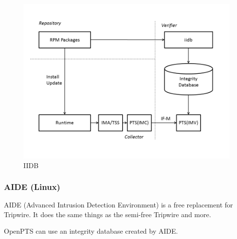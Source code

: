 \documentclass[12pt,a4paper]{article}
\begin{document}
\begin{figure}[b!p]
  \begin{center}
    \includegraphics[width=12cm]{OpenPTS_fig_iidb.png}
  \end{center}
  \caption{IIDB}
  \label{fig:iidb} 
\end{figure}


\clearpage 
\subsubsection{AIDE (Linux)}

AIDE (Advanced Intrusion Detection Environment)\cite{aide} is a free replacement for Tripwire. It does the same things as the semi-free Tripwire and more.

OpenPTS can use an integrity database created by AIDE.
\end{document}
